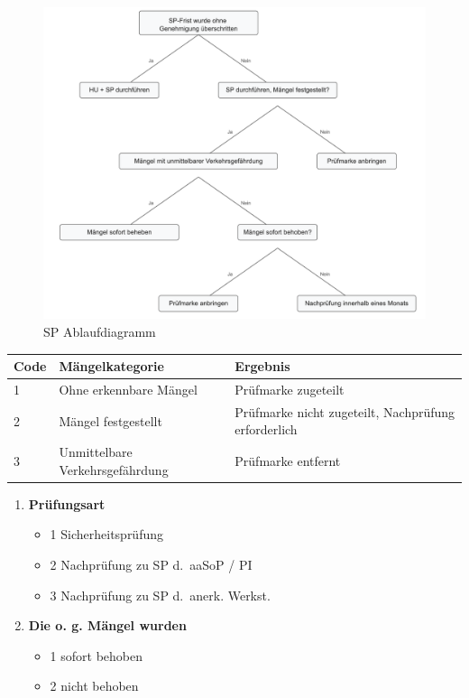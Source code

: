 \documentclass{vorlage-design-main}
\begin{document}
\begin{figure}
\centering
\includegraphics[width=0.8\linewidth,keepaspectratio]{images/SP-Ablaufdiagramm.png}
\caption{SP Ablaufdiagramm}
\end{figure}

\begin{table}[ht]
  \begin{tabular}{@{}lll@{}}
\toprule
Code
 & 
Mängelkategorie
 & 
Ergebnis
 \\
\midrule[\heavyrulewidth]
1 & Ohne erkennbare Mängel & Prüfmarke zugeteilt \\
2 & Mängel festgestellt & Prüfmarke nicht zugeteilt, Nachprüfung
erforderlich \\
3 & Unmittelbare Verkehrsgefährdung & Prüfmarke entfernt \\
\bottomrule
\end{tabular}%
\end{table}

\begin{enumerate}
\def\labelenumi{\arabic{enumi}.}

\item
  \textbf{Prüfungsart}

  \begin{itemize}
  
  \item
    1 Sicherheitsprüfung
  \item
    2 Nachprüfung zu SP d.~aaSoP / PI
  \item
    3 Nachprüfung zu SP d.~anerk. Werkst.
  \end{itemize}
\item
  \textbf{Die o. g. Mängel wurden}

  \begin{itemize}
  
  \item
    1 sofort behoben
  \item
    2 nicht behoben
  \end{itemize}
\end{enumerate}
\end{document}
